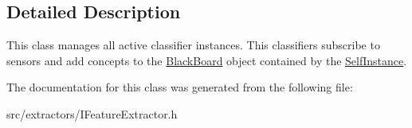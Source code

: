 \subsection{Detailed Description}
This class manages all active classifier instances. This classifiers subscribe to sensors and add concepts to the \hyperlink{class_black_board}{Black\+Board} object contained by the \hyperlink{class_self_instance}{Self\+Instance}. 

The documentation for this class was generated from the following file\+:\begin{DoxyCompactItemize}
\item 
src/extractors/I\+Feature\+Extractor.\+h\end{DoxyCompactItemize}
